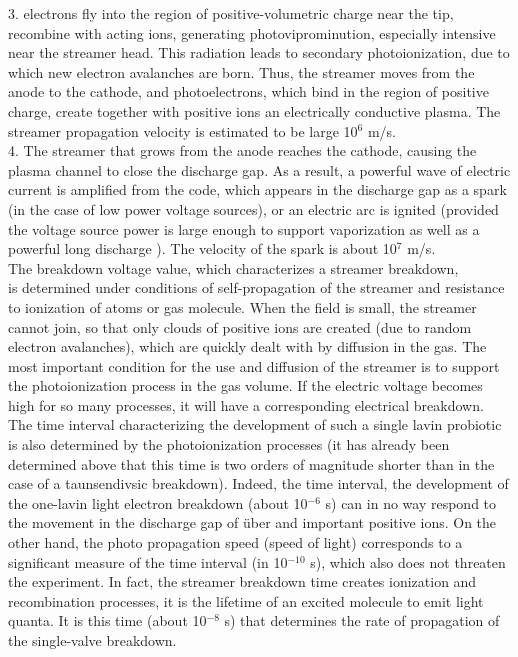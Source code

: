 \documentclass[a4paper,14pt]{extreport}
\begin{document}
3. electrons fly into the region of positive-volumetric charge near the tip, recombine with acting ions, generating photoviprominution, especially intensive near the streamer head. This radiation leads to secondary photoionization, due to which new electron avalanches are born. Thus, the streamer moves from the anode to the cathode, and photoelectrons, which bind in the region of positive charge, create together with positive ions an electrically conductive plasma. The streamer propagation velocity is estimated to be large 10$^6$ m/s. \\

4. The streamer that grows from the anode reaches the cathode, causing the plasma channel to close the discharge gap. As a result, a powerful wave of electric current is amplified from the code, which appears in the discharge gap as a spark (in the case of low power voltage sources), or an electric arc is ignited (provided the voltage source power is large enough to support vaporization as well as a powerful long discharge ). The velocity of the spark is about 10$^7$ m/s. \\

The breakdown voltage value, which characterizes a streamer breakdown, \\ is determined under conditions of self-propagation of the streamer and resistance to ionization of atoms or gas molecule. When the field is small, the streamer cannot join, so that only clouds of positive ions are created (due to random electron avalanches), which are quickly dealt with by diffusion in the gas. The most important condition for the use and diffusion of the streamer is to support the photoionization process in the gas volume. If the electric voltage becomes high for so many processes, it will have a corresponding electrical breakdown. \\

The time interval characterizing the development of such a single lavin probiotic is also determined by the photoionization processes (it has already been determined above that this time is two orders of magnitude shorter than in the case of a taunsendivsic breakdown). Indeed, the time interval, the development of the one-lavin light electron breakdown (about 10$^{-6}$ s) can in no way respond to the movement in the discharge gap of über and important positive ions. On the other hand, the photo propagation speed (speed of light) corresponds to a significant measure of the time interval (in 10$^{-10}$ s), which also does not threaten the experiment. In fact, the streamer breakdown time creates ionization and recombination processes, it is the lifetime of an excited molecule to emit light quanta. It is this time (about 10$^{-8}$ s) that determines the rate of propagation of the single-valve breakdown. \\
\end{document}
